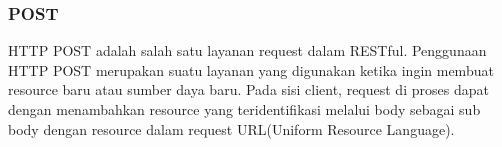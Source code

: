 \documentclass[12pt,a4paper]{article}
\begin{document}
\subsubsection{POST}
HTTP POST adalah salah satu layanan request dalam RESTful. Penggunaan HTTP POST merupakan suatu layanan yang digunakan ketika ingin membuat resource baru atau sumber daya baru. Pada sisi client, request di proses dapat dengan menambahkan resource yang teridentifikasi melalui body sebagai sub body dengan resource dalam request URL(Uniform Resource Language).
\end{document}
